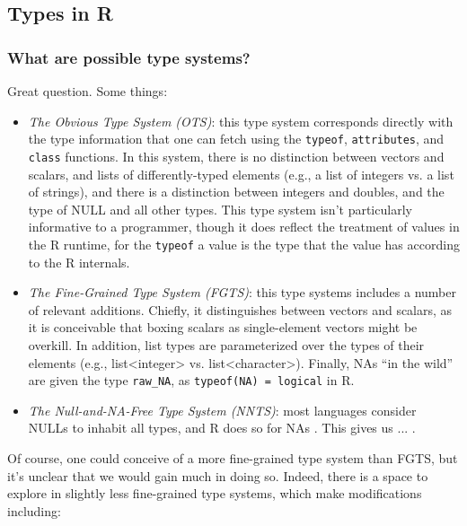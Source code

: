 \documentclass[acmsmall,10pt,review,anonymous]{acmart}\settopmatter{printfolios=true,printccs=false,printacmref=false}
\begin{document}

%
%
%
%
\subsection{Types in R}


%
%
\subsubsection{What are possible type systems?}

Great question.
Some things:

\begin{itemize}

\item {\it The Obvious Type System (OTS)}: this type system corresponds directly with the type information that one can fetch using the {\tt typeof}, {\tt attributes}, and {\tt class} functions.
In this system, there is no distinction between vectors and scalars, and lists of differently-typed elements (e.g., a list of integers vs. a list of strings), and there is a distinction between integers and doubles, and the type of NULL and all other types.
This type system isn't particularly informative to a programmer, though it does reflect the treatment of values in the R runtime, for the {\tt typeof} a value is the type that the value has according to the R internals.

\item {\it The Fine-Grained Type System (FGTS)}: this type systems includes a number of relevant additions.
Chiefly, it distinguishes between vectors and scalars, as it is conceivable that boxing scalars as single-element vectors might be overkill.
In addition, list types are parameterized over the types of their elements (e.g., list<integer> vs. list<character>).
Finally, NAs ``in the wild'' are given the type {\tt raw\_NA}, as {\tt typeof(NA) = logical} in R.

\item {\it The Null-and-NA-Free Type System (NNTS)}: most languages consider NULLs to inhabit all types, and R does so for NAs .
This gives us ... .

\end{itemize}

Of course, one could conceive of a more fine-grained type system than FGTS, but it's unclear that we would gain much in doing so.
Indeed, there is a space to explore in slightly less fine-grained type systems, which make modifications including:
\end{document}
